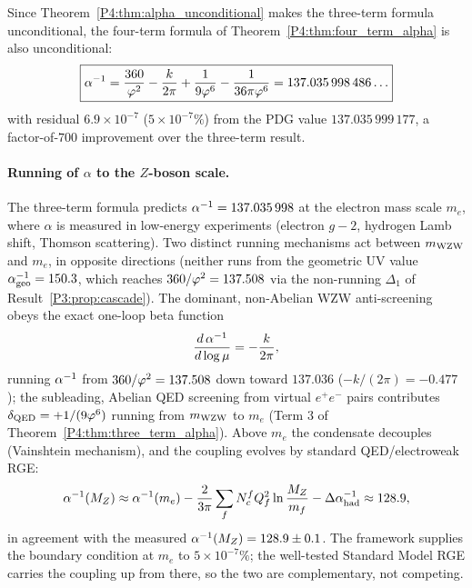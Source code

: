 \begin{corollary}
\label{P4:cor:four_term_unconditional}
Since Theorem~\ref{P4:thm:alpha_unconditional} makes the three-term formula
unconditional, the four-term formula of Theorem~\ref{P4:thm:four_term_alpha}
is also unconditional:
\begin{equation}
  \boxed{
  \alpha^{-1}
  = \frac{360}{\varphi^2} - \frac{k}{2\pi}
  + \frac{1}{9\varphi^6} - \frac{1}{36\pi\varphi^6}
  = 137.035\,998\,486\ldots
  }
  \label{P4:eq:four_term_unconditional}
\end{equation}
with residual $6.9\times10^{-7}$ ($5\times10^{-7}\%$) from the PDG value
$137.035\,999\,177$, a factor-of-$700$ improvement over the three-term result.
\end{corollary}

\paragraph{Running of $\alpha$ to the $Z$-boson scale.}
The three-term formula predicts $\alpha^{-1}=137.035\,998$ at the electron
mass scale $m_e$, where $\alpha$ is measured in low-energy experiments
(electron $g-2$, hydrogen Lamb shift, Thomson scattering). Two distinct
running mechanisms act between $m_{\mathrm{WZW}}$ and $m_e$, in opposite directions
(neither runs from the geometric UV value $\alpha^{-1}_{\mathrm{geo}}=150.3$,
which reaches $360/\varphi^2=137.508$ via the non-running $\Delta_1$ of
Result~\ref{P3:prop:cascade}). The dominant, non-Abelian WZW
anti-screening obeys the exact one-loop beta function
\begin{equation}
  \frac{d\,\alpha^{-1}}{d\log\mu} = -\frac{k}{2\pi},
  \label{P4:eq:wzw_beta_running}
\end{equation}
running $\alpha^{-1}$ from $360/\varphi^2=137.508$ down toward $137.036$
($-k/(2\pi)=-0.477$); the subleading, Abelian QED screening from
virtual $e^+e^-$ pairs contributes $\delta_{\rm QED}=+1/(9\varphi^6)$
running from $m_{\mathrm{WZW}}$ to $m_e$ (Term 3 of Theorem~\ref{P4:thm:three_term_alpha}).
Above $m_e$ the condensate decouples (Vainshtein mechanism), and the
coupling evolves by standard QED/electroweak RGE:
\begin{equation}
  \alpha^{-1}(M_Z)
  \approx \alpha^{-1}(m_e)
         - \frac{2}{3\pi}\sum_f N_c^f Q_f^2 \ln\frac{M_Z}{m_f}
         - \Delta\alpha^{-1}_{\rm had}
  \approx 128.9,
  \label{P4:eq:running_to_MZ}
\end{equation}
in agreement with the measured $\alpha^{-1}(M_Z)=128.9\pm0.1$. The framework
supplies the boundary condition at $m_e$ to $5\times10^{-7}\%$; the
well-tested Standard Model RGE carries the coupling up from there, so
the two are complementary, not competing.

